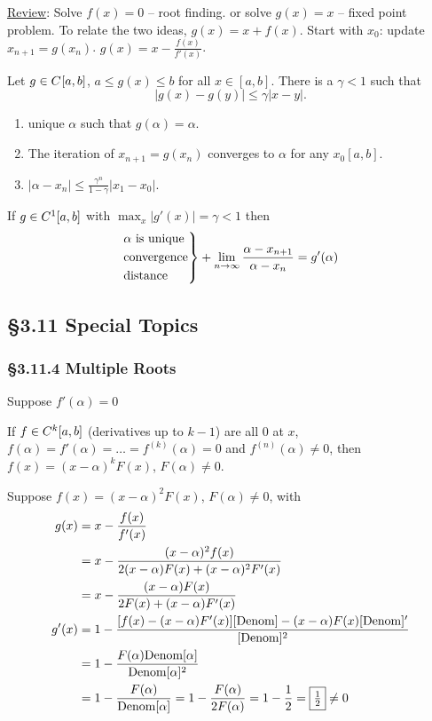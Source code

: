 \documentclass[]{article}
\begin{document}
\ul{Review}:
Solve $f(x)=0$ -- root finding.
or solve $g(x)=x$ -- fixed point problem.
To relate the two ideas, $g(x)=x+f(x)$.
Start with $x_0$: update $x_{n+1} = g(x_n)$.
$g(x) = x-\frac{f(x)}{f'(x)}$.
\begin{theorem}
	Let $g\in C^{}{[}a,b{]}$, $a\leq g(x)\leq b$ for all $x\in[a,b]$.
	There is a $\gamma<1$ such that $$|g(x)-g(y)|\leq\gamma|x-y|.$$
	\begin{enumerate}
		\item unique $\alpha$ such that $g(\alpha)=\alpha$.
		\item The iteration of $x_{n+1}=g(x_n)$ converges to $\alpha$ for any $x_0[a,b]$.
		\item $|\alpha-x_n|\leq \frac{\gamma^n}{1-\gamma}|x_1-x_0|$.
	\end{enumerate}
	If $g\in C^{1}{[}a,b{]}$ with $\max_x|g'(x)| = \gamma<1$ then
	$$ \begin{rcases} \alpha \text{ is unique} \\ \text{convergence} \\ \text{distance} \end{rcases} + \lim_{n\rightarrow\infty} \frac{\alpha-x_{n+1}}{\alpha-x_n} = g'(\alpha) $$
\end{theorem}

\subsection*{\S3.11 Special Topics}
\subsubsection*{\S3.11.4 Multiple Roots}
Suppose $f'(\alpha)=0$

\begin{lemma}
	If $f\in C^{k}{[}a,b{]}$ (derivatives up to $k-1$) are all 0 at $x$, $f(\alpha) = f'(\alpha) = \dots = f^{(k)}(\alpha) = 0$ and $f^{(n)}(\alpha)\neq0$, then $f(x) = (x-\alpha)^k F(x)$, $F(\alpha)\neq0$.
\end{lemma}
\begin{example}
	Suppose $f(x) = (x-\alpha)^2F(x)$, $F(\alpha)\neq0$, with 
	\begin{align*}
		g(x) &= x-\frac{f(x)}{f'(x)} \\
			 &= x-\frac{(x-\alpha)^2f(x)}{2(x-\alpha)F(x) + (x-\alpha)^2F'(x)} \\
			 &= x-\frac{(x-\alpha)F(x)}{2F(x)+(x-\alpha)F'(x)} \\
		g'(x) &= 1- \frac{[f(x)-(x-\alpha)F'(x)][\text{Denom}] - (x-\alpha)F(x)[\text{Denom}]'}{[\text{Denom}]^2} \\
			  &= 1- \frac{F(\alpha) \text{Denom}[\alpha]}{\text{Denom}[\alpha]^2} \\
			  &= 1- \frac{F(\alpha)}{\text{Denom}[\alpha]} = 1 - \frac{F(\alpha)}{2F(\alpha)} = 1-\frac12 = \fbox{$\frac12$} \neq 0
	\end{align*}
\end{example}
\end{document}
